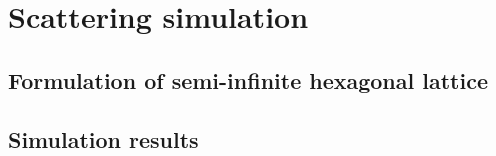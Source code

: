 \chapter{Scattering simulation}

\section{Formulation of semi-infinite hexagonal lattice}
\label{riblattice}

\section{Simulation results}
\label{scattering}
